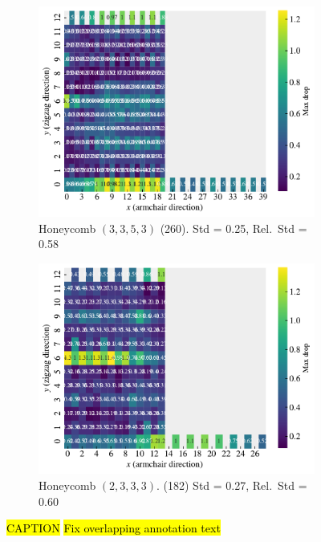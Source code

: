 \begin{figure}[H]
  \hfill
  \begin{subfigure}[t]{0.49\textwidth}
      \centering
      \includegraphics[width=\textwidth]{figures/search/ref_search_drop_hon_3_3_5_3_ref_search.pdf}
      \caption{Honeycomb $(3,3,5,3)$ (260). Std = 0.25, Rel.\ Std = 0.58}
  \end{subfigure}
  \hfill
  \begin{subfigure}[t]{0.49\textwidth}
      \centering
      \includegraphics[width=\textwidth]{figures/search/ref_search_drop_hon_2_3_3_3_ref_search.pdf}
      \caption{Honeycomb $(2,3,3,3)$. (182)  Std = 0.27, Rel.\ Std = 0.60}
  \end{subfigure}
  \hfill
  \caption{\hl{CAPTION} \hl{Fix overlapping annotation text}}
  \label{fig:ref_search_top_data}
\end{figure}

